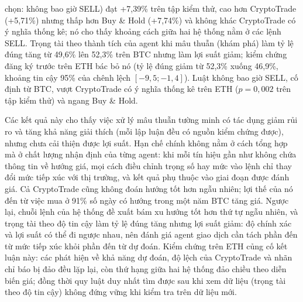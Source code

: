 \begin{description}[leftmargin=1.2cm,style=nextline]
  chọn: không bao giờ SELL) đạt +7,39\% trên tập kiểm thử, cao hơn CryptoTrade (+5,71\%) nhưng thấp hơn Buy \& Hold
  (+7,74\%) và không khác CryptoTrade có ý nghĩa thống kê; nó cho thấy khoảng cách giữa hai hệ thống nằm ở các lệnh SELL.
  Trọng tài theo thành tích của agent khi mâu thuẫn (khám phá) làm tỷ lệ đúng tăng từ 49,6\% lên 52,3\% trên BTC nhưng
  làm lợi suất giảm; kiểm chứng đăng ký trước trên ETH bác bỏ nó (tỷ lệ đúng giảm từ 52,3\% xuống 46,9\%, khoảng tin cậy
  95\% của chênh lệch $[-9{,}5; -1{,}4]$). Luật không bao giờ SELL, cố định từ BTC, vượt CryptoTrade có ý nghĩa thống kê
  trên ETH ($p=0{,}002$ trên tập kiểm thử) và ngang Buy \& Hold.
\end{description}

Các kết quả này cho thấy việc xử lý mâu thuẫn tường minh có tác dụng giảm rủi ro và tăng khả năng giải thích (mỗi lập
luận đều có nguồn kiểm chứng được), nhưng chưa cải thiện được lợi suất. Hạn chế chính không nằm ở cách tổng hợp mà ở chất
lượng nhận định của từng agent: khi mỗi tín hiệu gần như không chứa thông tin về hướng giá, mọi cách điều chỉnh trọng
số hay mức vào lệnh chỉ thay đổi mức tiếp xúc với thị trường, và kết quả phụ thuộc vào giai đoạn được đánh giá. Cả
CryptoTrade cũng không đoán hướng tốt hơn ngẫu nhiên; lợi thế của nó đến từ việc mua ở 91\% số ngày có hướng trong một
năm BTC tăng giá. Ngược lại, chuỗi lệnh của hệ thống đề xuất bám xu hướng tốt hơn thứ tự ngẫu nhiên, và trọng tài theo
độ tin cậy làm tỷ lệ đúng tăng nhưng lợi suất giảm: độ chính xác và lợi suất có thể đi ngược nhau, nên đánh giá agent
giao dịch cần tách phần đến từ mức tiếp xúc khỏi phần đến từ dự đoán. Kiểm chứng trên ETH củng cố kết luận này: các
phát hiện về khả năng dự đoán, độ lệch của CryptoTrade và nhãn chỉ báo bị đảo đều lặp lại, còn thứ hạng giữa hai hệ thống
đảo chiều theo diễn biến giá; đồng thời quy luật duy nhất tìm được sau khi xem dữ liệu (trọng tài theo độ tin cậy) không
đứng vững khi kiểm tra trên dữ liệu mới.

